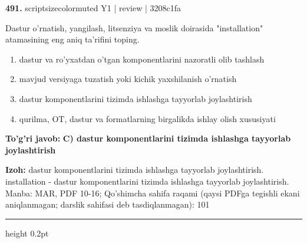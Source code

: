 \documentclass[10pt,a4paper]{article}
\begin{document}
{\bfseries\sffamily\color{ink} 491.} {scriptsizecolor{muted} Y1 | review | 3208c1fa}
\par
Dastur o'rnatish, yangilash, litsenziya va moslik doirasida "installation" atamasining eng aniq ta'rifini toping.
\begin{enumerate}[label=\Alph*),leftmargin=9mm]
\item dastur va ro'yxatdan o'tgan komponentlarini nazoratli olib tashlash
\item mavjud versiyaga tuzatish yoki kichik yaxshilanish o'rnatish
\item dastur komponentlarini tizimda ishlashga tayyorlab joylashtirish
\item qurilma, OT, dastur va formatlarning birgalikda ishlay olish xususiyati
\end{enumerate}
\begin{tcolorbox}[enhanced,breakable,colback=teal!4,colframe=teal!60!black,boxrule=0.45pt,arc=1.2mm,left=2.7mm,right=2.7mm,top=1.8mm,bottom=1.8mm,before skip=2mm,after skip=2mm]
{\bfseries\sffamily\color{teal}To'g'ri javob:} \textbf{C) dastur komponentlarini tizimda ishlashga tayyorlab joylashtirish}
\par\smallskip
{\bfseries Izoh:} dastur komponentlarini tizimda ishlashga tayyorlab joylashtirish. installation - dastur komponentlarini tizimda ishlashga tayyorlab joylashtirish. Manba: MAR, PDF 10-16; Qo'shimcha sahifa raqami (qaysi PDFga tegishli ekani aniqlanmagan; darslik sahifasi deb tasdiqlanmagan): 101
\end{tcolorbox}
\vspace{2mm}\hrule height 0.2pt\vspace{3mm}
\end{document}
